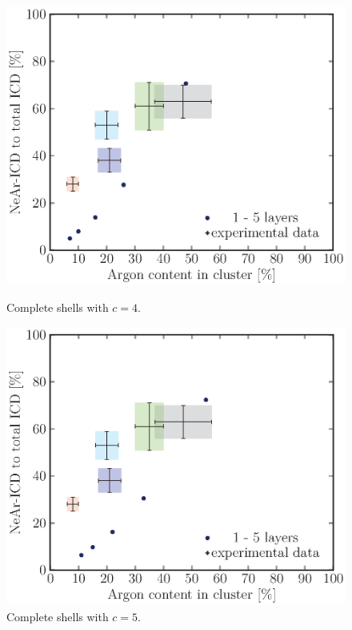 \begin{figure}[!h]
\begin{minipage}{0.48\textwidth}
    \centering
    \includegraphics[scale=0.5]{pics/compl04.ps}
    \caption{Complete shells with $c=4$.}
    \label{compl04}
\end{minipage}
\hfill
\begin{minipage}{0.48\textwidth}
    \centering
    \includegraphics[scale=0.5]{pics/compl05.ps}
    \caption{Complete shells with $c=5$.}
    \label{compl05}
\end{minipage}
\end{figure}

